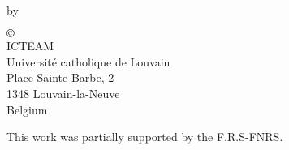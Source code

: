 \newpage
\thispagestyle{empty}

\noindent
{\Large \thesisTitle}\\
\vspace{0.5cm}
by \thesisAuthor\\
\vspace{1.5cm}

\noindent
$\copyright$ \\
ICTEAM\\
Universit\'e catholique de Louvain\\
Place Sainte-Barbe, 2\\
1348 Louvain-la-Neuve\\
Belgium

\vspace{10cm}

\noindent
This work was partially supported by the F.R.S-FNRS.
